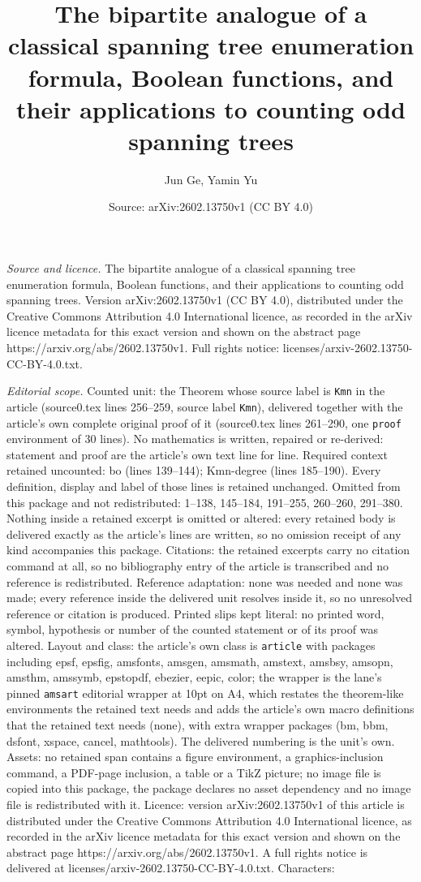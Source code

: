\documentclass[10pt,a4paper]{amsart}
\title[The bipartite analogue of a classical spanning tree enumerat]{The bipartite analogue of a classical spanning tree enumeration formula, Boolean functions, and their applications to counting odd spanning trees}
\author{Jun Ge, Yamin Yu}
\date{Source: arXiv:2602.13750v1 (CC BY 4.0)}
\begin{document}
\maketitle

\noindent\emph{Source and licence.} The bipartite analogue of a classical spanning tree enumeration formula, Boolean functions, and their applications to counting odd spanning trees. Version arXiv:2602.13750v1 (CC BY 4.0), distributed under the Creative Commons Attribution 4.0 International licence, as recorded in the arXiv licence metadata for this exact version and shown on the abstract page https://arxiv.org/abs/2602.13750v1. Full rights notice: licenses/arxiv-2602.13750-CC-BY-4.0.txt.\par\smallskip

\noindent\textit{Editorial scope.} Counted unit: the Theorem whose source label is \texttt{Kmn} in the article (source0.tex lines 256--259, source label \texttt{Kmn}), delivered together with the article's own complete original proof of it (source0.tex lines 261--290, one \texttt{proof} environment of 30 lines). No mathematics is written, repaired or re-derived: statement and proof are the article's own text line for line. Required context retained uncounted: bo (lines 139--144); Kmn-degree (lines 185--190). Every definition, display and label of those lines is retained unchanged. Omitted from this package and not redistributed: 1--138, 145--184, 191--255, 260--260, 291--380. Nothing inside a retained excerpt is omitted or altered: every retained body is delivered exactly as the article's lines are written, so no omission receipt of any kind accompanies this package. Citations: the retained excerpts carry no citation command at all, so no bibliography entry of the article is transcribed and no reference is redistributed. Reference adaptation: none was needed and none was made; every reference inside the delivered unit resolves inside it, so no unresolved reference or citation is produced. Printed slips kept literal: no printed word, symbol, hypothesis or number of the counted statement or of its proof was altered. Layout and class: the article's own class is \texttt{article} with packages including epsf, epsfig, amsfonts, amsgen, amsmath, amstext, amsbsy, amsopn, amsthm, amssymb, epstopdf, ebezier, eepic, color; the wrapper is the lane's pinned \texttt{amsart} editorial wrapper at 10pt on A4, which restates the theorem-like environments the retained text needs and adds the article's own macro definitions that the retained text needs (none), with extra wrapper packages (bm, bbm, dsfont, xspace, cancel, mathtools). The delivered numbering is the unit's own. Assets: no retained span contains a figure environment, a graphics-inclusion command, a PDF-page inclusion, a table or a TikZ picture; no image file is copied into this package, the package declares no asset dependency and no image file is redistributed with it. Licence: version arXiv:2602.13750v1 of this article is distributed under the Creative Commons Attribution 4.0 International licence, as recorded in the arXiv licence metadata for this exact version and shown on the abstract page https://arxiv.org/abs/2602.13750v1. A full rights notice is delivered at licenses/arxiv-2602.13750-CC-BY-4.0.txt. Characters: 
\end{document}

